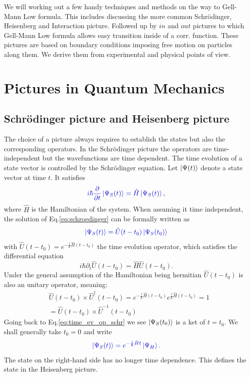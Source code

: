 \documentclass[12pt, titlepage]{article}
\begin{document}
We will working out a few handy techniques and methods on the way to Gell-Mann Low formula. This includes discussing the more common Schrödinger, Heisenberg and Interaction picture. Followed up by $ in $ and $ out $ pictures to which Gell-Mann Low formula allows easy transition inside of a corr. function. These pictures are based on boundary conditions imposing free motion on particles along them. We derive them from experimental and physical points of view.
\section{Pictures in Quantum Mechanics }\label{Pictures in Quantum Mechanics}
\subsection{Schrödinger picture and Heisenberg picture}\label{SHpicture}
The choice of a picture always requires to establish the states but also the corresponding operators. 
In the Schrödinger picture the operators are time-independent but the wavefunctions are time dependent. The time evolution of a state vector is controlled by the Schrödinger equation. Let $ \ket{\Psi(t)} $ denote a state vector at time $ t $. It satisfies
\begin{equation}\label{eq:schroedinger}
\textcolor[RGB]{0,0,204}{
i \hbar \frac{\partial }{\partial t} \ket{\Psi_{S}(t)} =
\hat{H} \ket{\Psi_{S}(t)},
}
\end{equation}
where $ \hat{H} $ is the Hamiltonian of the system. When assuming it time independent, the solution of Eq.\enskip\eqref{eq:schroedinger} can be formally written as 
\begin{equation}\label{eq:time_ev_op_schr}
\textcolor[RGB]{0,0,204}{
\ket{\Psi_{S}(t)} 
=\hat{U}(t-t_{0})\ket{\Psi_{S}(t_0)}
}
\end{equation}
with $ \hat{U}(t-t_{0}) = e^{-\frac{i}{\hbar}\hat{H}(t-t_{0})} $ the time evolution operator, which satisfies the differential equation 
\begin{equation}\label{evo_U_1}
i\hbar\partial_{t}\hat{U}(t-t_{0})=\hat{H}\hat{U}(t-t_{0})
. 
\end{equation}
Under the general assumption of the Hamiltonian being hermitian $ \hat{U}(t-t_{0}) $  is also an unitary operator, meaning:
\begin{equation}\label{Unitary_U}
\begin{split}
&\hat{U}(t-t_{0}) \times \hat{U}^{\dagger}(t-t_{0}) = e^{-\frac{i}{\hbar}\hat{H}(t-t_{0})} e^{\frac{i}{\hbar}\hat{H}(t-t_{0})}=1
\\
&=\hat{U}(t-t_{0}) \times \hat{U}^{-1}(t-t_{0})
\end{split}
\end{equation}
 Going back to Eq.\enskip\eqref{eq:time_ev_op_schr} we see $ \ket{\Psi_{S}(t_0)} $ is a ket of $ t=t_{0} $. We shall generally take $ t_{0}=0 $ and write
\begin{equation}\label{eq:phi_s_and_phi_h}
\textcolor[RGB]{0,0,204}{
\ket{\Psi_{S}(t)} 
= e^{-\frac{i}{\hbar}\hat{H}t}
\ket{\Psi_{H}}.
}
\end{equation}
The state on the right-hand side has no longer time dependence. This defines the  state in the Heisenberg picture.
\end{document}
